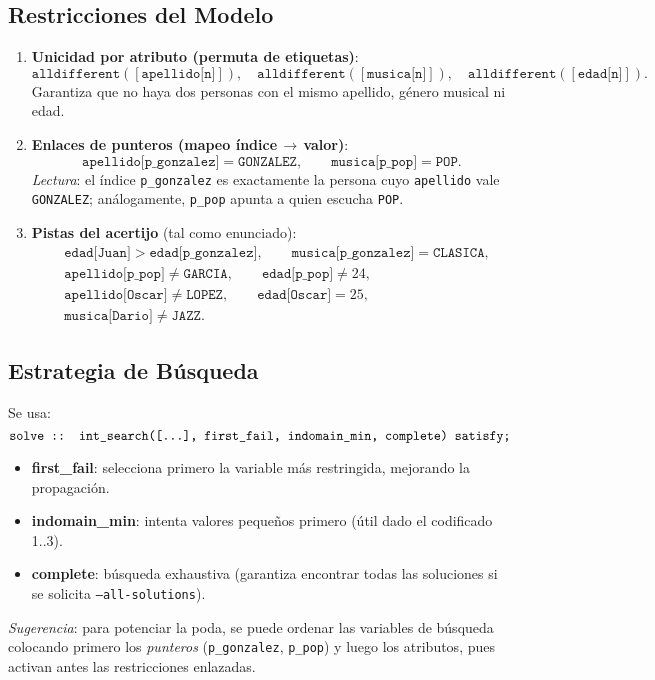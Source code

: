 \subsection*{Restricciones del Modelo}
\begin{enumerate}
  \item \textbf{Unicidad por atributo (permuta de etiquetas)}:
  \[
  \texttt{alldifferent}([\texttt{apellido[n]}]),\quad
  \texttt{alldifferent}([\texttt{musica[n]}]),\quad
  \texttt{alldifferent}([\texttt{edad[n]}]).
  \]
  Garantiza que no haya dos personas con el mismo apellido, género musical ni edad.
  \item \textbf{Enlaces de punteros (mapeo índice\,$\rightarrow$\,valor)}:
  \[
  \texttt{apellido[p\_gonzalez]} = \texttt{GONZALEZ},\qquad
  \texttt{musica[p\_pop]} = \texttt{POP}.
  \]
  \textit{Lectura}: el índice \texttt{p\_gonzalez} es exactamente la persona cuyo \texttt{apellido} vale \texttt{GONZALEZ}; análogamente, \texttt{p\_pop} apunta a quien escucha \texttt{POP}.
  \item \textbf{Pistas del acertijo} (tal como enunciado):
  \[
  \begin{aligned}
  &\texttt{edad[Juan]} > \texttt{edad[p\_gonzalez]},\qquad
  \texttt{musica[p\_gonzalez]} = \texttt{CLASICA},\\
  &\texttt{apellido[p\_pop]} \neq \texttt{GARCIA},\qquad
  \texttt{edad[p\_pop]} \neq 24,\\
  &\texttt{apellido[Oscar]} \neq \texttt{LOPEZ},\qquad
  \texttt{edad[Oscar]} = 25,\\
  &\texttt{musica[Dario]} \neq \texttt{JAZZ}.
  \end{aligned}
  \]
\end{enumerate}

\subsection*{Estrategia de Búsqueda}
Se usa:
\[
\texttt{solve :: int\_search([\dots], first\_fail, indomain\_min, complete) satisfy;}
\]
\begin{itemize}
  \item \textbf{first\_fail}: selecciona primero la variable más restringida, mejorando la propagación.
  \item \textbf{indomain\_min}: intenta valores pequeños primero (útil dado el codificado 1..3).
  \item \textbf{complete}: búsqueda exhaustiva (garantiza encontrar todas las soluciones si se solicita \texttt{--all-solutions}).
\end{itemize}
\textit{Sugerencia}: para potenciar la poda, se puede ordenar las variables de búsqueda colocando primero los \emph{punteros} (\texttt{p\_gonzalez}, \texttt{p\_pop}) y luego los atributos, pues activan antes las restricciones enlazadas.

